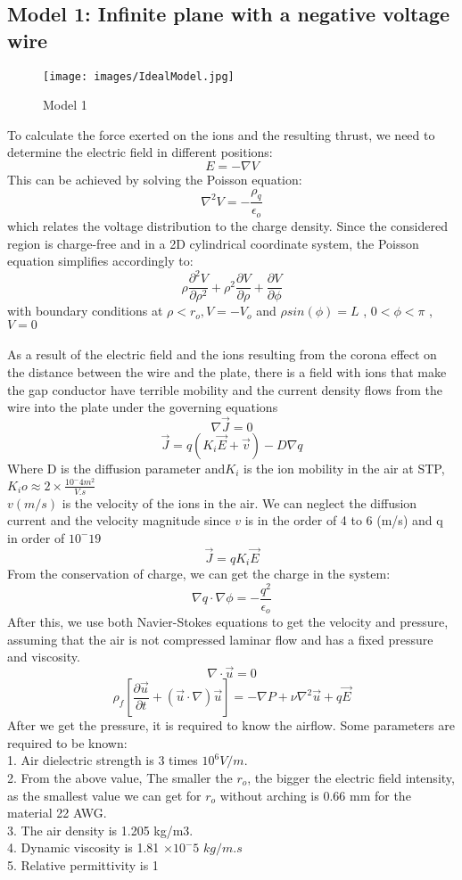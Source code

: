 \subsection*{Model 1: Infinite plane with a negative voltage wire}
\begin{figure}[ht]
\texttt{[image: images/IdealModel.jpg]}
\caption{Model 1}
\end{figure}
To calculate the force exerted on the ions and the resulting thrust, we need to determine the electric field in different positions:
$$E = - \nabla V $$
This can be achieved by solving the Poisson equation\cite{sakr2}:
$$\nabla^2 V = - \frac{\rho_q }{\epsilon_o}$$
which relates the voltage distribution to the charge density. Since the considered region is charge-free and in a 2D cylindrical coordinate system, the Poisson equation simplifies accordingly to:
$$ \rho\frac{\partial^2 V}{\partial \rho^2}+ \rho^2\frac{\partial V}{\partial \rho} +\frac{\partial V}{\partial \phi}$$
with boundary conditions at $\rho < r_o , V=-V_o $  and $ \rho sin(\phi)=L$ , $ 0<\phi < \pi$  , $V=0$\\\\
\hspace{\parindent}As a result of the electric field and the ions resulting from the corona effect on the distance between the wire and the plate, there is a field with ions that make the gap conductor have terrible mobility and the current density flows from the wire into the plate under the governing equations 
$$\nabla \Vec{J} = 0$$
$$\Vec{J} = q(K_i \Vec{E} + \Vec{v}) - D\nabla q$$
Where D is the diffusion parameter and$ K_i$ is the ion mobility in the air at STP,
$K_io \approx 2 \times \frac{10^-4 m^2}{V.s} $\cite{sakr2}\\
$v(m/s)$ is the velocity of the ions in the air.
We can neglect the diffusion current and the velocity magnitude since $v$ is in the order of 4 to 6 (m/s) and q in order of $10^-19$\cite{sakr2}
$$\Vec{J} = qK_i\vec{E}$$
From the conservation of charge, we can get the charge in the system:
$$\nabla q \cdot \nabla \phi = -\frac{q^2}{\epsilon_o}$$
After this, we use both Navier-Stokes equations to get the velocity and pressure, assuming that the air is not compressed laminar flow and has a fixed pressure and viscosity.
$$\nabla \cdot \vec{u} = 0$$
$$\rho_f [\frac{\partial\Vec{u}}{\partial t} + (\Vec{u}\cdot \nabla) \Vec{u}] = -\nabla P + \nu \nabla^2 \vec{u} + q\vec{E}$$
After we get the pressure, it is required to know the airflow. Some parameters are required to be known: \\
1. Air dielectric strength is 3 times $10^6 V/m$.\\
2. From the above value, The smaller the $r_o$, the bigger the electric field intensity, as the smallest value we can get for $r_o$ without arching is 0.66 mm for the material 22 AWG.\\
3. The air density is 1.205 kg/m3.\\
4. Dynamic viscosity is 1.81 $\times 10^-5$ $kg/m.s$\\
5. Relative permittivity is 1\\
